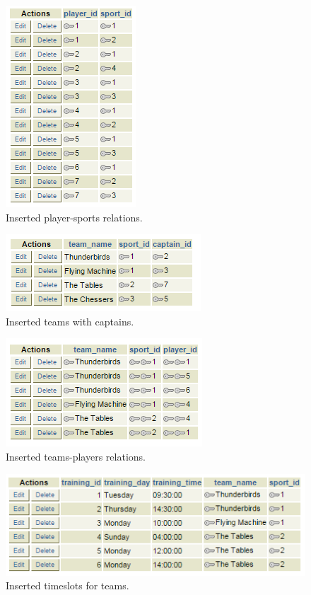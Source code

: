 \documentclass[11pt, article]{article}
\begin{document}
\begin{figure}[ht!]
\includegraphics[center]{PlayersSports.png}
 \caption{Inserted player-sports relations.}
\end{figure}

\begin{figure}[ht!]
\includegraphics[center]{Teams.png}
 \caption{Inserted teams with captains.}
\end{figure}

\begin{figure}[ht!]
\includegraphics[center]{HasPlayers.png}
 \caption{Inserted teams-players relations.}
\end{figure}

\begin{figure}[ht!]
\includegraphics[center]{Timeslot.png}
 \caption{Inserted timeslots for teams.}
\end{figure}
\end{document}
